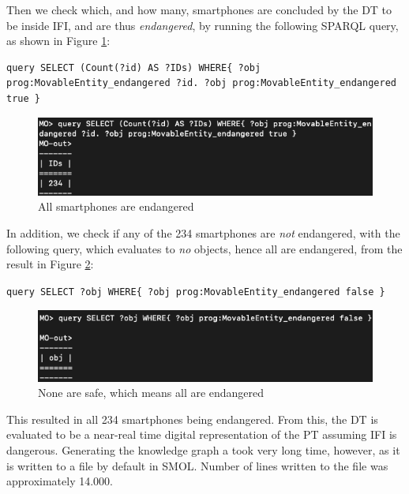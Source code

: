 \documentclass{article}
\begin{document}
Then we check which, and how many, smartphones are concluded by the DT to be inside IFI, and are thus \emph{endangered}, by running the following SPARQL query, as shown in Figure \ref{fig:234_smartphones}:
\newline
\begin{small}
\begin{Verbatim}[breaklines]
query SELECT (Count(?id) AS ?IDs) WHERE{ ?obj prog:MovableEntity_endangered ?id. ?obj prog:MovableEntity_endangered true }
\end{Verbatim}
\end{small}
\begin{figure}
    \centering
    \includegraphics[scale=0.50]{graphics/234_smartphones.png}
    \caption{All smartphones are endangered}
    \label{fig:234_smartphones}
\end{figure}


In addition, we check if any of the 234 smartphones are \emph{not} endangered, with the following query, which evaluates to \emph{no} objects, hence all are endangered, from the result in Figure \ref{fig:all_are_safe}:
\newline
\begin{small}
\verb|query SELECT ?obj WHERE{ ?obj prog:MovableEntity_endangered false }|
\end{small}
\begin{figure}
    \centering
    \includegraphics[scale=0.50]{graphics/all_are_safe.png}
    \caption{None are safe, which means all are endangered}
    \label{fig:all_are_safe}
\end{figure}


This resulted in all 234 smartphones being endangered. From this, the DT is evaluated to be a near-real time digital representation of the PT assuming IFI is dangerous. Generating the knowledge graph a took very long time, however, as it is written to a file by default in SMOL. Number of lines written to the file was approximately 14.000.
\end{document}
